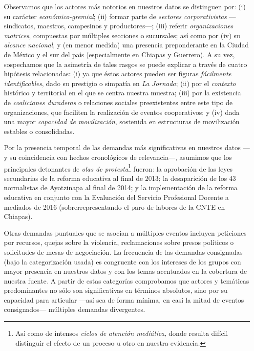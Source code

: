 \documentclass[letterpaper, 11pt]{book}
\theoremstyle{definition}
\theoremstyle{remark}
\begin{document}
Observamos que los actores más notorios en nuestros datos se distinguen por: 
(i) su carácter \emph{económico-gremial}; 
(ii) formar parte de \emph{sectores corporativistas} ---sindicatos, maestros, campesinos y productores---; 
(iii) referir \emph{organizaciones matrices}, compuestas por múltiples secciones o sucursales; 
así como por (iv) su \emph{alcance nacional}, y (en menor medida) una presencia preponderante en la Ciudad de México y el sur del país (especialmente en Chiapas y Guerrero). 
A su vez, sospechamos que la asimetría de tales rasgos se puede explicar a través de cuatro hipótesis relacionadas: 
(i) ya que éstos actores pueden ser figuras \emph{fácilmente identificables}, dado su prestigio o simpatía en \emph{La Jornada}; 
(ii) por el \emph{contexto} histórico y territorial en el que se centra nuestra muestra; 
(iii) por la existencia de \emph{coaliciones duraderas} o relaciones sociales preexistentes entre este tipo de organizaciones, que faciliten la realización de eventos cooperativos; 
y (iv) dada una mayor \emph{capacidad de movilización}, sostenida en estructuras de movilización estables o consolidadas. 


Por la presencia temporal de las demandas más significativas en nuestros datos ---y su coincidencia con hechos cronológicos de relevancia---, asumimos que los principales detonantes de \emph{olas de protesta}\footnote{
    Así como de intensos \emph{ciclos de atención mediática}, donde resulta difícil distinguir el efecto de un proceso u otro en nuestra evidencia. 
} fueron: 
la aprobación de las leyes secundarias de la reforma educativa al final de 2013; 
la desaparición de los 43 normalistas de Ayotzinapa al final de 2014; 
y la implementación de la reforma educativa en conjunto con la Evaluación del Servicio Profesional Docente a mediados de 2016 (sobrerrepresentando el paro de labores de la CNTE en Chiapas). 


Otras demandas puntuales que se asocian a múltiples eventos incluyen peticiones por recursos, quejas sobre la violencia, reclamaciones sobre presos políticos o solicitudes de mesas de negociación. 
La frecuencia de las demandas consignadas (bajo la categorización usada) es congruente con los intereses de los grupos con mayor presencia en nuestros datos y con los temas acentuados en la cobertura de nuestra fuente. 
A partir de estas categorías comprobamos que actores y temáticas predominantes no sólo son significativas en términos absolutos, sino por su capacidad para articular ---así sea de forma mínima, en casi la mitad de eventos consignados--- múltiples demandas divergentes. 
\end{document}
